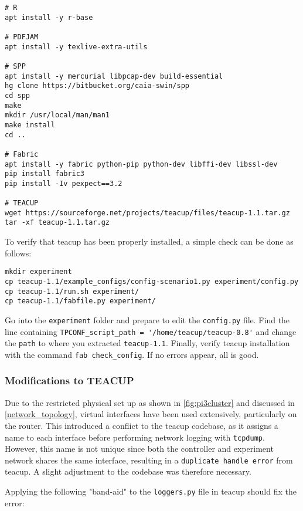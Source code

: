 \begin{verbatim}
# R
apt install -y r-base

# PDFJAM
apt install -y texlive-extra-utils

# SPP
apt install -y mercurial libpcap-dev build-essential
hg clone https://bitbucket.org/caia-swin/spp
cd spp
make
mkdir /usr/local/man/man1
make install
cd ..

# Fabric
apt install -y fabric python-pip python-dev libffi-dev libssl-dev
pip install fabric3
pip install -Iv pexpect==3.2

# TEACUP
wget https://sourceforge.net/projects/teacup/files/teacup-1.1.tar.gz
tar -xf teacup-1.1.tar.gz
\end{verbatim}

To verify that \gls{teacup} has been properly installed, a simple check can be done as follows:

\begin{verbatim}
mkdir experiment
cp teacup-1.1/example_configs/config-scenario1.py experiment/config.py
cp teacup-1.1/run.sh experiment/
cp teacup-1.1/fabfile.py experiment/
\end{verbatim}

Go into the \lstinline{experiment} folder and prepare to edit the \lstinline{config.py} file. Find the line containing \lstinline{TPCONF_script_path = '/home/teacup/teacup-0.8'} and change the \lstinline{path} to where you extracted \lstinline{teacup-1.1}. Finally, verify \gls{teacup} installation with the command \lstinline{fab check_config}. If no errors appear, all is good.


\subsubsection{Modifications to TEACUP}

Due to the restricted physical set up as shown in \ref{fig:pi3cluster} and discussed in \ref{network_topology}, virtual interfaces have been used extensively, particularly on the router. This introduced a conflict to the \gls{teacup} codebase, as it assigns a name to each interface before performing network logging with \lstinline{tcpdump}. However, this name is not unique since both the controller and experiment network shares the same interface, resulting in a \lstinline{duplicate handle error} from \gls{teacup}. A slight adjustment to the codebase was therefore necessary.

Applying the following "band-aid" to the \lstinline{loggers.py} file in \gls{teacup} should fix the error:

